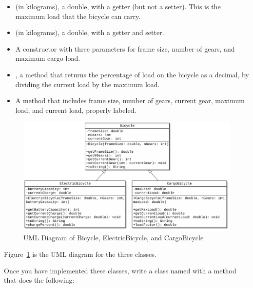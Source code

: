 \begin{exercise}
\begin{itemize}
\item {} (in kilograms), a double, with a getter (but not a setter). This is the maximum load that the bicycle can carry.
\item {} (in kilograms), a double, with a getter and setter.
\item A constructor with three parameters for frame size, number of gears, and maximum cargo load.
\item {}, a method that returns the percentage of load on the bicycle as a decimal, by dividing the current load by the maximum load.
\item A  method that includes frame size, number of gears, current gear, maximum load, and current load, properly labeled.
\end{itemize}

\begin{figure}[!ht]
\begin{center}
\includegraphics[scale=0.5]{figs/ch14/polymorphism_bikes.pdf}
\caption{UML Diagram of Bicycle, ElectricBicycle, and CargoBicycle}
\label{fig.polyBicycles}
\end{center}
\end{figure}

Figure~\ref{fig.polyBicycles} is the UML diagram for the three classes.

Once you have implemented these classes, write a class named  with a  method that does the following:


\end{exercise}
